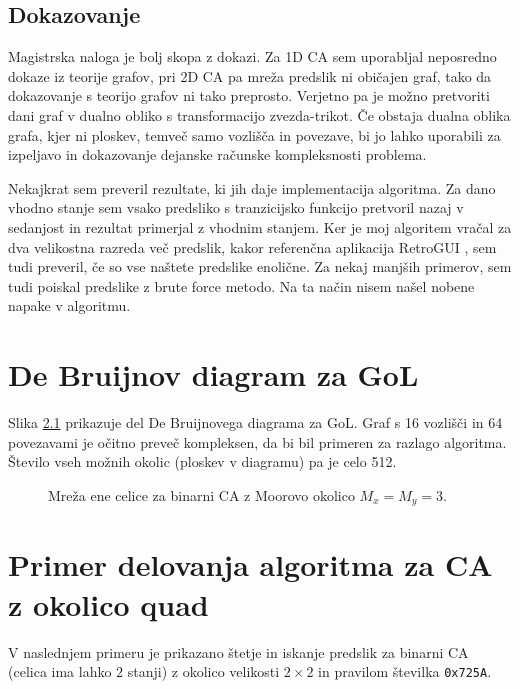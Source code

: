 \documentclass[12pt,a4paper,openany,twoside]{book}
\begin{document}
\section{Dokazovanje}

Magistrska naloga je bolj skopa z dokazi.
Za 1D CA sem uporabljal neposredno dokaze iz teorije grafov,
pri 2D CA pa mreža predslik ni običajen graf,
tako da dokazovanje s teorijo grafov ni tako preprosto.
Verjetno pa je možno pretvoriti dani graf v dualno obliko s transformacijo zvezda-trikot.
Če obstaja dualna oblika grafa, kjer ni ploskev, temveč samo vozlišča in povezave,
bi jo lahko uporabili za izpeljavo in dokazovanje dejanske računske kompleksnosti problema.

Nekajkrat sem preveril rezultate, ki jih daje implementacija algoritma.
Za dano vhodno stanje sem vsako predsliko s tranzicijsko funkcijo
pretvoril nazaj v sedanjost in rezultat primerjal z vhodnim stanjem.
Ker je moj algoritem vračal za dva velikostna razreda več predslik,
kakor referenčna aplikacija RetroGUI \cite{Bickford2012},
sem tudi preveril, če so vse naštete predslike enolične.
Za nekaj manjših primerov, sem tudi poiskal predslike z brute force metodo.
Na ta način nisem našel nobene napake v algoritmu.


\appendix

\chapter{De Bruijnov diagram za GoL}

Slika \ref{network_single_moore} prikazuje del De Bruijnovega diagrama za GoL.
Graf s 16 vozlišči in 64 povezavami je očitno preveč kompleksen, da bi bil primeren za razlago algoritma.
Število vseh možnih okolic (ploskev v diagramu) pa je celo 512.

\begin{figure}[htb]
\centerline{}
\caption[Mreža ene celice za GoL.]{Mreža ene celice za binarni CA z Moorovo okolico \(M_x=M_y=3\).}
\label{network_single_moore}
\end{figure}

\chapter{Primer delovanja algoritma za CA z okolico quad}

V naslednjem primeru je prikazano štetje in iskanje predslik
za binarni CA (celica ima lahko \(2\) stanji) z okolico velikosti \(2 \times 2\)
in pravilom številka \verb|0x725A|.
\end{document}
